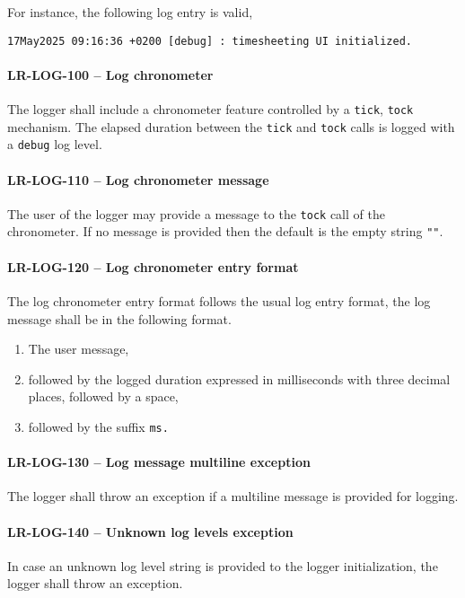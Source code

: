For instance, the following log entry is valid,
\begin{lstlisting}[numbers=none]
17May2025 09:16:36 +0200 [debug] : timesheeting UI initialized.
\end{lstlisting}

\paragraph{LR-LOG-100 -- Log chronometer}
The logger shall include a chronometer feature controlled by
a \lstinline{tick}, \lstinline{tock} mechanism.
The elapsed duration between the \lstinline{tick} and \lstinline{tock}
calls is logged with a \lstinline{debug} log level.

\paragraph{LR-LOG-110 -- Log chronometer message}
The user of the logger may provide a message to the \lstinline{tock}
call of the chronometer. If no message is provided then the default
is the empty string \lstinline{""}.

\paragraph{LR-LOG-120 -- Log chronometer entry format}
The log chronometer entry format follows the usual log entry format,
the log message shall be in the following format.
\begin{enumerate}
\item The user message,
\item followed by the logged duration expressed in milliseconds
  with three decimal places, followed by a space,
\item followed by the suffix \lstinline{ms.}
\end{enumerate}

\paragraph{LR-LOG-130 -- Log message multiline exception}
The logger shall throw an exception if a multiline message is provided
for logging.

\paragraph{LR-LOG-140 -- Unknown log levels exception}
In case an unknown log level string is provided to the logger initialization,
the logger shall throw an exception.

